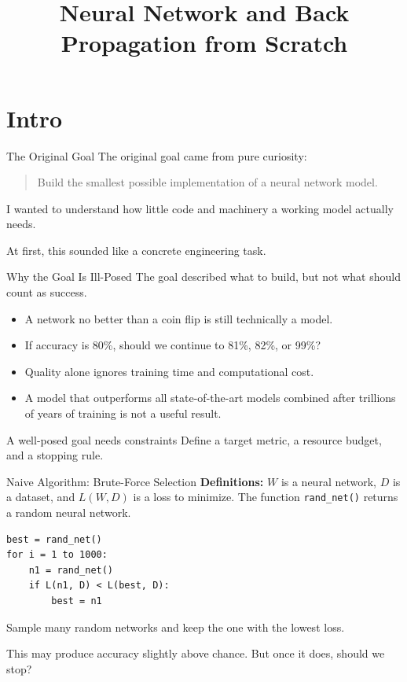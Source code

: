 \documentclass[aspectratio=169]{beamer}
\title{Neural Network and Back Propagation from Scratch}
\author{}
\date{}
\begin{document}
\begin{frame}[plain]
  \titlepage
\end{frame}

\section{Intro}

\begin{frame}{The Original Goal}
  The original goal came from pure curiosity:

  \begin{quote}
    Build the smallest possible implementation of a neural network model.
  \end{quote}

  I wanted to understand how little code and machinery a working model
  actually needs.

  At first, this sounded like a concrete engineering task.
\end{frame}

\begin{frame}{Why the Goal Is Ill-Posed}
  The goal described what to build, but not what should count as success.

  \begin{itemize}
    \item A network no better than a coin flip is still technically a model.
    \item If accuracy is 80\%, should we continue to 81\%, 82\%, or 99\%?
    \item Quality alone ignores training time and computational cost.
    \item A model that outperforms all state-of-the-art models combined after
      trillions of years of training is not a useful result.
  \end{itemize}

  \begin{block}{A well-posed goal needs constraints}
    Define a target metric, a resource budget, and a stopping rule.
  \end{block}
\end{frame}

\begin{frame}[fragile]{Naive Algorithm: Brute-Force Selection}
  \small
  \textbf{Definitions:} $W$ is a neural network, $D$ is a dataset, and
  $L(W, D)$ is a loss to minimize. The function \texttt{rand\_net()} returns
  a random neural network.

\begin{verbatim}
best = rand_net()
for i = 1 to 1000:
    n1 = rand_net()
    if L(n1, D) < L(best, D):
        best = n1
\end{verbatim}

  Sample many random networks and keep the one with the lowest loss.

  This may produce accuracy slightly above chance. But once it does, should we
  stop?
\end{frame}
\end{document}

